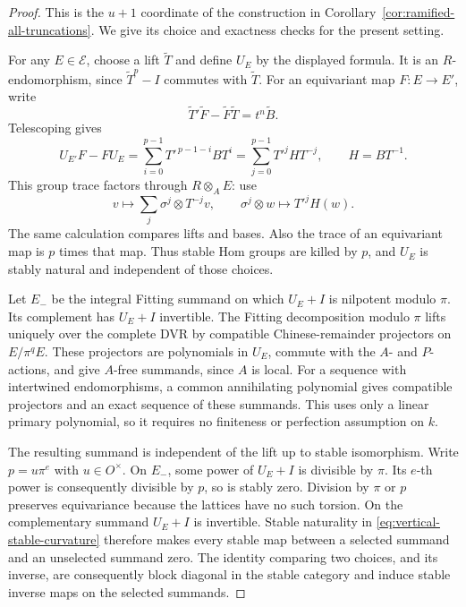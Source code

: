 \begin{proof}
This is the \(u+1\) coordinate of the construction in
Corollary~\ref{cor:ramified-all-truncations}.
We give its choice and exactness checks for the present setting.

For any \(E\in\mathcal E\), choose a lift \(\widetilde T\) and
define \(U_E\) by the displayed formula.
It is an \(R\)-endomorphism, since
\(\widetilde T^p-I\) commutes with \(\widetilde T\).
For an equivariant map \(F:E\to E'\), write
\[
 \widetilde T'\widetilde F-\widetilde F\widetilde T
       =t^n\widetilde B.
\]
Telescoping gives
\begin{equation}\label{eq:vertical-stable-curvature}
 U_{E'}F-FU_E
 =\sum_{i=0}^{p-1}T'^{\,p-1-i}BT^i
 =\sum_{j=0}^{p-1}T'^jHT^{-j},
 \qquad H=BT^{-1}.
\end{equation}
This group trace factors through \(R\otimes_A E\): use
\[
 v\longmapsto\sum_j\sigma^j\otimes T^{-j}v,\qquad
 \sigma^j\otimes w\longmapsto T'^jH(w).
\]
The same calculation compares lifts and bases.  Also the trace
of an equivariant map is \(p\) times that map.  Thus stable Hom
groups are killed by \(p\), and \(U_E\) is stably natural and
independent of those choices.

Let \(E_-\) be the integral Fitting summand on which \(U_E+I\)
is nilpotent modulo \(\pi\).  Its complement has \(U_E+I\)
invertible.  The Fitting decomposition modulo \(\pi\) lifts
uniquely over the complete DVR by compatible Chinese-remainder
projectors on \(E/\pi^qE\).  These projectors are polynomials in
\(U_E\), commute with the \(A\)- and \(P\)-actions, and give
\(A\)-free summands, since \(A\) is local.  For a sequence with
intertwined endomorphisms, a common annihilating polynomial gives
compatible projectors and an exact sequence of these summands.
This uses only a linear primary polynomial, so it requires no
finiteness or perfection assumption on \(k\).

The resulting summand is independent of the lift up to stable
isomorphism.  Write \(p=u\pi^e\) with \(u\in O^\times\).
On \(E_-\), some power of \(U_E+I\) is divisible by \(\pi\).
Its \(e\)-th power is consequently divisible by \(p\), so is
stably zero.  Division by \(\pi\) or \(p\) preserves equivariance
because the lattices have no such torsion.
On the complementary summand \(U_E+I\) is invertible.
Stable naturality in \eqref{eq:vertical-stable-curvature}
therefore makes every stable map between a selected summand and
an unselected summand zero.  The identity comparing two choices,
and its inverse, are consequently block diagonal in the stable
category and induce stable inverse maps on the selected summands.


\end{proof}
